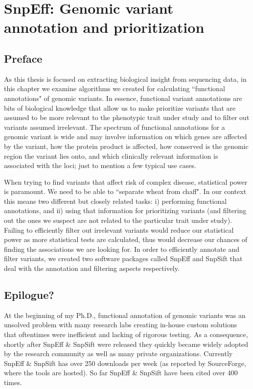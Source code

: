 
\chapter{SnpEff: Genomic variant annotation and prioritization\label{ch:snpeff}}

\section{Preface}

As this thesis is focused on extracting biological insight from sequencing data, in this chapter we examine algorithms we created for calculating ``functional annotations" of genomic variants. In essence, functional variant annotations are bits of biological knowledge that allow us to make prioritize variants that are assumed to be more relevant to the phenotypic trait under study and to filter out variants assumed irrelevant. The spectrum of functional annotations for a genomic variant is wide and may involve information on which genes are affected by the variant, how the protein product is affected, how conserved is the genomic region the variant lies onto, and which clinically relevant information is associated with the loci; just to mention a few typical use cases.

When trying to find variants that affect risk of complex disease, statistical power is paramount. We need to be able to ``separate wheat from chaff". In our context this means two different but closely related tasks: i) performing functional annotations, and ii) using that information for prioritizing variants (and filtering out the ones we suspect are not related to the particular trait under study). Failing to efficiently filter out irrelevant variants would reduce our statistical power as more statistical tests are calculated, thus would decrease our chances of finding the associations we are looking for. In order to efficiently annotate and filter variants, we created two software packages called SnpEff and SnpSift that deal with the annotation and filtering aspects respectively.

\section{Epilogue?}

At the beginning of my Ph.D., functional annotation of genomic variants was an unsolved problem with many research labs creating in-house custom solutions that oftentimes were inefficient and lacking of rigorous testing. As a consequence, shortly after SnpEff \& SnpSift were released they quickly became widely adopted by the research community as well as many private organizations. Currently SnpEff \& SnpSift has over 250 downloads per week (as reported by  SourceForge, where the tools are hosted). So far SnpEff \& SnpSift  have been cited over 400 times.


